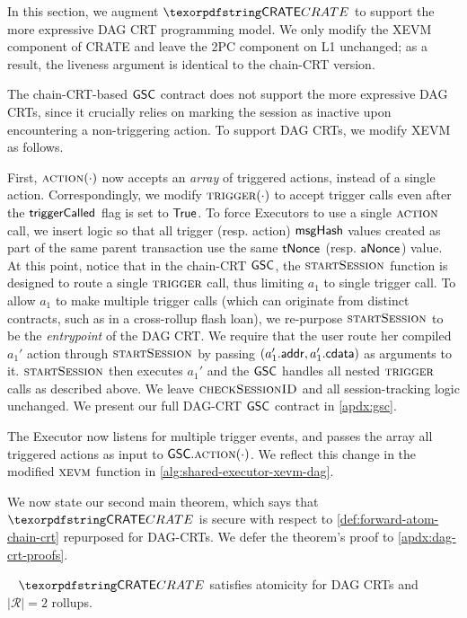 In this section, we
augment $\pname$ to support the more expressive DAG CRT programming model. We only modify the XEVM component of CRATE and leave the 2PC component on L1 unchanged; as a result, the liveness argument is identical to the chain-CRT version.

The chain-CRT-based $\mathsf{GSC}$ contract does not support the more expressive DAG CRTs, since it crucially relies on marking the session as inactive upon encountering a non-triggering action.
To support DAG CRTs, we modify XEVM as follows. 

First, $\action(\cdot)$ now accepts an \emph{array} of triggered actions, instead of a single action. Correspondingly, we modify $\trigger(\cdot)$ to accept trigger calls even after the $\mathsf{triggerCalled_{}}$ flag is set to $\mathsf{True}$. 
To force Executors to use a single $\action$ call, we insert logic so that all trigger (resp. action) $\mathsf{msgHash}$ values created as part of the same parent transaction use the same $\mathsf{tNonce_{}}$ (resp. $\mathsf{aNonce_{}}$) value. At this point, notice that in the chain-CRT $\mathsf{GSC}$, the $\textproc{startSession}$ function is designed to route a single $\trigger$ call, thus limiting $a_1$ to single trigger call. To allow $a_1$ to make multiple trigger calls (which can originate from distinct contracts, such as in a cross-rollup flash loan), we re-purpose $\textproc{startSession}$ to be the \emph{entrypoint} of the DAG CRT. We require that the user route her compiled $a_1'$ action through $\textproc{startSession}$ by passing $(a_1'.\mathsf{addr}{}, a_1'.\mathsf{cdata}{})$ as arguments to it. $\textproc{startSession}$ then executes $a_1'$ and the $\mathsf{GSC}$ handles all nested $\trigger$ calls as described above. We leave $\textproc{checkSessionID}$ and all session-tracking logic unchanged.
We present our full DAG-CRT $\mathsf{GSC}$ contract in \cref{apdx:gsc}.

The Executor now listens for multiple trigger events, and passes the array all triggered actions as input to $\gsc.\action(\cdot)$. We reflect this change in the modified $\textproc{xevm}$ function in \cref{alg:shared-executor-xevm-dag}.


We now state our second main theorem, which says that $\pname$ is secure with respect to \cref{def:forward-atom-chain-crt} repurposed for DAG-CRTs. We defer the theorem's proof to \cref{apdx:dag-crt-proofs}. 


\begin{theorem}~\label{thm:dag-crate-forward-atomicity-two-rollups}
     $\pname$ satisfies atomicity for DAG CRTs and $|\mathcal{R}| = 2$ rollups.
\end{theorem}
